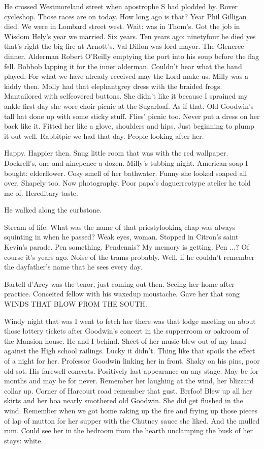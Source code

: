 He crossed Westmoreland street when apostrophe S had plodded by.
Rover cycleshop. Those races are on today. How long ago is that? Year
Phil Gilligan died. We were in Lombard street west. Wait: was in Thom's.
Got the job in Wisdom Hely's year we married. Six years. Ten years ago:
ninetyfour he died yes that's right the big fire at Arnott's. Val Dillon
was lord mayor. The Glencree dinner. Alderman Robert O'Reilly emptying the
port into his soup before the flag fell. Bobbob lapping it for the inner
alderman. Couldn't hear what the band played. For what we have already
received may the Lord make us. Milly was a kiddy then. Molly had that
elephantgrey dress with the braided frogs. Mantailored with selfcovered
buttons. She didn't like it because I sprained my ankle first day she wore
choir picnic at the Sugarloaf. As if that. Old Goodwin's tall hat done up
with some sticky stuff. Flies' picnic too. Never put a dress on her back
like it. Fitted her like a glove, shoulders and hips. Just beginning to
plump it out well. Rabbitpie we had that day. People looking after her.

Happy. Happier then. Snug little room that was with the red
wallpaper. Dockrell's, one and ninepence a dozen. Milly's tubbing night.
American soap I bought: elderflower. Cosy smell of her bathwater. Funny
she looked soaped all over. Shapely too. Now photography. Poor papa's
daguerreotype atelier he told me of. Hereditary taste.

He walked along the curbstone.

Stream of life. What was the name of that priestylooking chap was
always squinting in when he passed? Weak eyes, woman. Stopped in
Citron's saint Kevin's parade. Pen something. Pendennis? My memory is
getting. Pen ...? Of course it's years ago. Noise of the trams probably.
Well, if he couldn't remember the dayfather's name that he sees every day.

Bartell d'Arcy was the tenor, just coming out then. Seeing her home
after practice. Conceited fellow with his waxedup moustache. Gave her that
song WINDS THAT BLOW FROM THE SOUTH.

Windy night that was I went to fetch her there was that lodge meeting
on about those lottery tickets after Goodwin's concert in the supperroom
or oakroom of the Mansion house. He and I behind. Sheet of her music blew
out of my hand against the High school railings. Lucky it didn't. Thing
like that spoils the effect of a night for her. Professor Goodwin linking
her in front. Shaky on his pins, poor old sot. His farewell concerts.
Positively last appearance on any stage. May be for months and may be for
never. Remember her laughing at the wind, her blizzard collar up. Corner
of Harcourt road remember that gust. Brrfoo! Blew up all her skirts and
her boa nearly smothered old Goodwin. She did get flushed in the wind.
Remember when we got home raking up the fire and frying up those pieces
of lap of mutton for her supper with the Chutney sauce she liked. And the
mulled rum. Could see her in the bedroom from the hearth unclamping the
busk of her stays: white.


